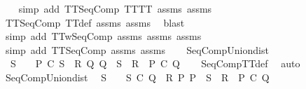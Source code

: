 \begin{isabellebody}
\ \ \isamarkupfalse%
\ {\isacharparenleft}simp\ add{\isacharcolon}\ TT{}{\isacharunderscore}SeqComp\ TT{\isacharunderscore}TT{}\ assms{\isacharparenleft}{}{\isacharparenright}\ assms{\isacharparenleft}{}{\isacharparenright}{\isacharparenright}\isanewline
\ \ \isamarkupfalse%
\ TT{}{\isacharunderscore}SeqComp\ TT{\isacharunderscore}def\ assms{\isacharparenleft}{}{\isacharparenright}\ assms{\isacharparenleft}{}{\isacharparenright}\ \isamarkupfalse%
\ blast\isanewline
\ \ \isamarkupfalse%
\ {\isacharparenleft}simp\ add{\isacharcolon}\ TT{}w{\isacharunderscore}SeqComp\ assms{\isacharparenleft}{}{\isacharparenright}\ assms{\isacharparenleft}{}{\isacharparenright}\ assms{\isacharparenleft}{}{\isacharparenright}{\isacharparenright}\isanewline
\ \ \isamarkupfalse%
\ {\isacharparenleft}simp\ add{\isacharcolon}\ TT{}{\isacharunderscore}SeqComp\ assms{\isacharparenleft}{}{\isacharparenright}\ assms{\isacharparenleft}{}{\isacharparenright}{\isacharparenright}\isanewline
\ \ \isamarkupfalse%
%
\endisatagproof
{\isafoldproof}%
%
\isadelimproof
\isanewline
%
\endisadelimproof
\isanewline
{}\isamarkupfalse%
\ SeqComp{\isacharunderscore}Union{\isacharunderscore}dist{}{\isacharcolon}\isanewline
\ \ {\isachardoublequoteopen}S\ {\isasymnoteq}\ {\isacharbraceleft}{\isacharbraceright}\ {\isasymLongrightarrow}\ P\ {\isacharsemicolon}\isactrlsub C\ {\isacharparenleft}{\isasymUnion}S{\isacharparenright}\ {\isacharequal}\ {\isasymUnion}{\isacharbraceleft}R{\isachardot}\ {\isasymexists}Q{\isachardot}\ Q\ {\isasymin}\ S\ {\isasymand}\ R\ {\isacharequal}\ P\ {\isacharsemicolon}\isactrlsub C\ Q{\isacharbraceright}{\isachardoublequoteclose}\isanewline
%
\isadelimproof
\ \ %
\endisadelimproof
%
\isatagproof
{}\isamarkupfalse%
\ SeqCompTT{\isacharunderscore}def\ \isamarkupfalse%
\ auto%
\endisatagproof
{\isafoldproof}%
%
\isadelimproof
\isanewline
%
\endisadelimproof
\isanewline
{}\isamarkupfalse%
\ SeqComp{\isacharunderscore}Union{\isacharunderscore}dist{}{\isacharcolon}\isanewline
\ \ {\isachardoublequoteopen}S\ {\isasymnoteq}\ {\isacharbraceleft}{\isacharbraceright}\ {\isasymLongrightarrow}\ {\isacharparenleft}{\isasymUnion}S{\isacharparenright}\ {\isacharsemicolon}\isactrlsub C\ Q\ {\isacharequal}\ {\isasymUnion}{\isacharbraceleft}R{\isachardot}\ {\isasymexists}P{\isachardot}\ P\ {\isasymin}\ S\ {\isasymand}\ R\ {\isacharequal}\ P\ {\isacharsemicolon}\isactrlsub C\ Q{\isacharbraceright}{\isachardoublequoteclose}\isanewline

\end{isabellebody}
